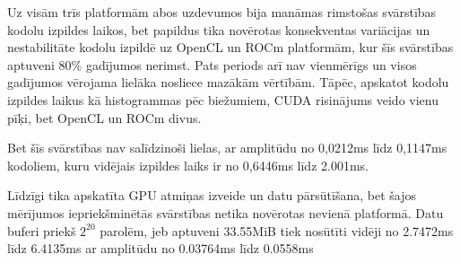 Uz visām trīs platformām abos uzdevumos bija manāmas rimstošas svārstības
kodolu izpildes laikos, bet papildus tika novērotas konsekventas variācijas un
nestabilitāte kodolu izpildē uz OpenCL un ROCm platformām, kur šīs svārstības
aptuveni 80\% gadījumos nerimst. Pats periods arī nav vienmērīgs un visos
gadījumos vērojama lielāka nosliece mazākām vērtībām. Tāpēc, apskatot
kodolu izpildes laikus kā histogrammas pēc biežumiem, CUDA risinājums veido
vienu pīķi, bet OpenCL un ROCm divus.

Bet šīs svārstības nav salīdzinoši lielas, ar amplitūdu no 0,0212\si{\ms} līdz
0,1147\si{\ms} kodoliem, kuru vidējais izpildes laiks ir no 0,6446\si{\ms} līdz
2.001\si{\ms}.

Līdzīgi tika apskatīta GPU atmiņas izveide un datu pārsūtīšana, bet šajos
mērījumos iepriekšminētās svārstības netika novērotas nevienā platformā.
Datu buferi priekš \(2^{20}\) parolēm, jeb aptuveni 33.55MiB tiek nosūtīti
vidēji no 2.7472\si{\ms} līdz 6.4135\si{\ms} ar amplitūdu no 0.03764\si{\ms} 
līdz 0.0558\si{\ms}
